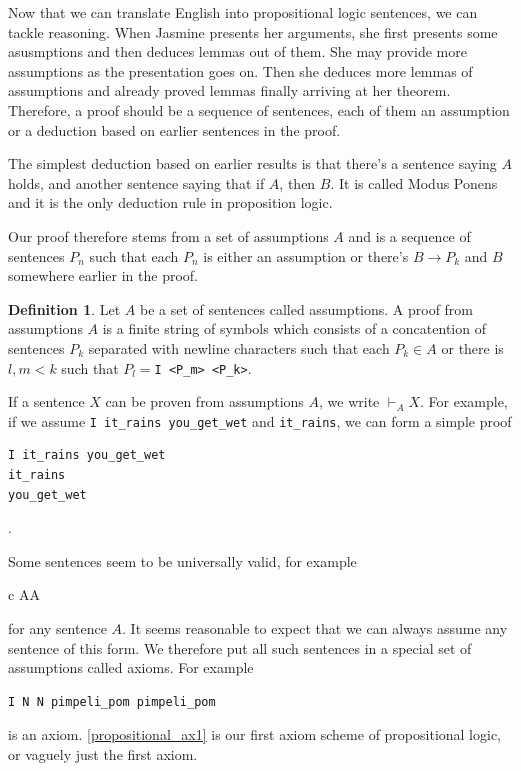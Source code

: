 \documentclass[11pt,oneside,%
]{memoir}
\newenvironment{eqna}{\begin{IEEEeqnarray}{c}}{\end{IEEEeqnarray}\ignorespacesafterend}
\theoremstyle{definition}
\newtheorem{maaritelma}{Definition}
\newcommand{\propositio}{\lstinline[language=propositio]}
\begin{document}
Now that we can translate English into propositional logic sentences, we can tackle reasoning. When Jasmine presents her arguments, she first presents some asusmptions and then deduces lemmas out of them. She may provide more assumptions as the presentation goes on. Then she deduces more lemmas of assumptions and already proved lemmas finally arriving at her theorem. Therefore, a proof should be a sequence of sentences, each of them an assumption or a deduction based on earlier sentences in the proof.

The simplest deduction based on earlier results is that there's a sentence saying \(A\) holds, and another sentence saying that if \(A\), then \(B\). It is called Modus Ponens and it is the only deduction rule in proposition logic.

Our proof therefore stems from a set of assumptions \(A\) and is a sequence of sentences \(P_n\) such that each \(P_n\) is either an assumption or there's \(B\rightarrow P_k\) and \(B\) somewhere earlier in the proof.

\begin{maaritelma}
Let \(A\) be a set of sentences called assumptions. A proof from assumptions \(A\) is a finite string of symbols which consists of a concatention of sentences \(P_k\) separated with newline characters such that each \(P_k\in A\) or there is \(l,m<k\) such that \(P_l=\)\lstinline[language=propositio]!I <P_m> <P_k>!.
\end{maaritelma}
If a sentence \(X\) can be proven from assumptions \(A\), we write \(\vdash_AX\). For example, if we assume \propositio!I it_rains you_get_wet! and \propositio!it_rains!, we can form a simple proof
\begin{lstlisting}[language=propositio]
I it_rains you_get_wet
it_rains
you_get_wet
\end{lstlisting}
.

Some sentences seem to be universally valid, for example
\begin{eqna}
    \neg\neg A\rightarrow A\label{propositional_ax1}
\end{eqna} for any sentence \(A\). It seems reasonable to expect that we can always assume any sentence of this form. We therefore put all such sentences in a special set of assumptions called axioms. For example
\begin{lstlisting}[language=propositio]
I N N pimpeli_pom pimpeli_pom
\end{lstlisting}
is an axiom. %
\eqref{propositional_ax1} is our first axiom scheme of propositional logic, or vaguely just the first axiom.
\end{document}
